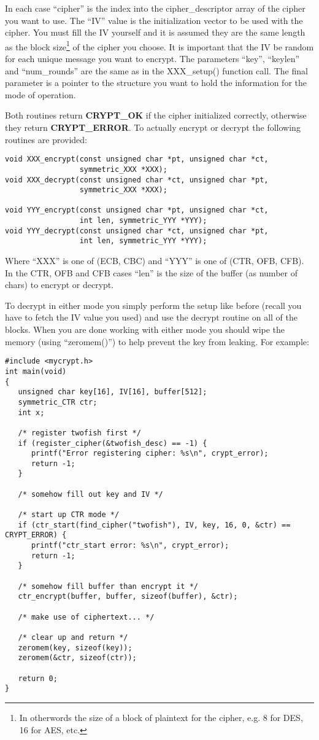 \documentclass{book}
\begin{document}
In each case ``cipher'' is the index into the cipher\_descriptor array of the cipher you want to use.  The ``IV'' value is 
the initialization vector to be used with the cipher.  You must fill the IV yourself and it is assumed they are the same 
length as the block size\footnote{In otherwords the size of a block of plaintext for the cipher, e.g. 8 for DES, 16 for AES, etc.} 
of the cipher you choose.  It is important that the IV  be random for each unique message you want to encrypt.  The 
parameters ``key'', ``keylen'' and ``num\_rounds'' are the same as in the XXX\_setup() function call.  The final parameter 
is a pointer to the structure you want to hold the information for the mode of operation.

Both routines return {\bf CRYPT\_OK} if the cipher initialized correctly, otherwise they return {\bf CRYPT\_ERROR}.  To 
actually encrypt or decrypt the following routines are provided:
\begin{verbatim}
void XXX_encrypt(const unsigned char *pt, unsigned char *ct, 
                 symmetric_XXX *XXX);
void XXX_decrypt(const unsigned char *ct, unsigned char *pt,
                 symmetric_XXX *XXX);

void YYY_encrypt(const unsigned char *pt, unsigned char *ct, 
                 int len, symmetric_YYY *YYY);
void YYY_decrypt(const unsigned char *ct, unsigned char *pt, 
                 int len, symmetric_YYY *YYY);
\end{verbatim}
Where ``XXX'' is one of (ECB, CBC) and ``YYY'' is one of (CTR, OFB, CFB).  In the CTR, OFB and CFB cases ``len'' is the
size of the buffer (as number of chars) to encrypt or decrypt.

To decrypt in either mode you simply perform the setup like before (recall you have to fetch the IV value you used)
and use the decrypt routine on all of the blocks.  When you are done working with either mode you should wipe the 
memory (using ``zeromem()'') to help prevent the key from leaking.  For example:
\newpage
\begin{small}
\begin{verbatim}
#include <mycrypt.h>
int main(void)
{
   unsigned char key[16], IV[16], buffer[512];
   symmetric_CTR ctr;
   int x;

   /* register twofish first */
   if (register_cipher(&twofish_desc) == -1) {
      printf("Error registering cipher: %s\n", crypt_error);
      return -1;
   }

   /* somehow fill out key and IV */

   /* start up CTR mode */
   if (ctr_start(find_cipher("twofish"), IV, key, 16, 0, &ctr) == CRYPT_ERROR) {
      printf("ctr_start error: %s\n", crypt_error);
      return -1;
   }

   /* somehow fill buffer than encrypt it */
   ctr_encrypt(buffer, buffer, sizeof(buffer), &ctr);

   /* make use of ciphertext... */

   /* clear up and return */
   zeromem(key, sizeof(key));
   zeromem(&ctr, sizeof(ctr));

   return 0;
}
\end{verbatim}
\end{small}
\end{document}

